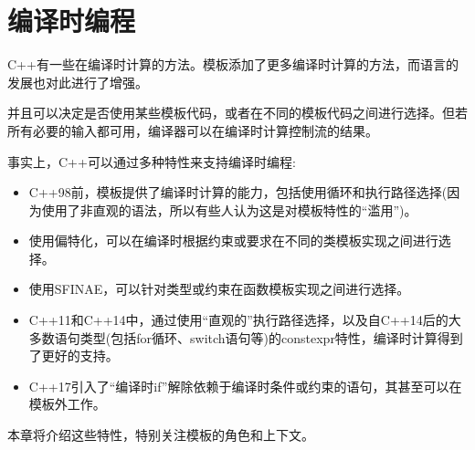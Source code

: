 \chapter{编译时编程}
C++有一些在编译时计算的方法。模板添加了更多编译时计算的方法，而语言的发展也对此进行了增强。

并且可以决定是否使用某些模板代码，或者在不同的模板代码之间进行选择。但若所有必要的输入都可用，编译器可以在编译时计算控制流的结果。

事实上，C++可以通过多种特性来支持编译时编程:

\begin{itemize}
\item 
C++98前，模板提供了编译时计算的能力，包括使用循环和执行路径选择(因为使用了非直观的语法，所以有些人认为这是对模板特性的“滥用”)。

\item 
使用偏特化，可以在编译时根据约束或要求在不同的类模板实现之间进行选择。

\item 
使用SFINAE，可以针对类型或约束在函数模板实现之间进行选择。

\item 
C++11和C++14中，通过使用“直观的”执行路径选择，以及自C++14后的大多数语句类型(包括for循环、switch语句等)的constexpr特性，编译时计算得到了更好的支持。

\item 
C++17引入了“编译时if”解除依赖于编译时条件或约束的语句，其甚至可以在模板外工作。
\end{itemize}

本章将介绍这些特性，特别关注模板的角色和上下文。








